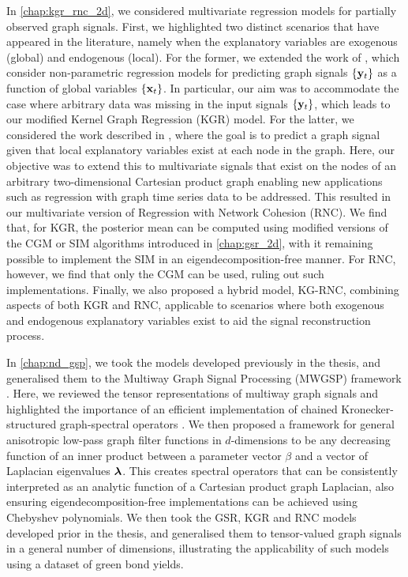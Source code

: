 In \cref{chap:kgr_rnc_2d}, we considered multivariate regression models for partially observed graph signals. First, we highlighted two distinct scenarios that have appeared in the literature, namely when the explanatory variables are exogenous (global) and endogenous (local). For the former, we extended the work of \cite{Venkitaraman2019,Venkitaraman2020}, which consider non-parametric regression models for predicting graph signals $\{\mathbf{y}_t\}$ as a function of global variables $\{\mathbf{x}_t\}$. In particular, our aim was to accommodate the case where arbitrary data was missing in the input signals $\{\mathbf{y}_t\}$, which leads to our modified Kernel Graph Regression (KGR) model. For the latter, we considered the work described in \cite{Li2019}, where the goal is to predict a graph signal given that local explanatory variables exist at each node in the graph. Here, our objective was to extend this to multivariate signals that exist on the nodes of an arbitrary two-dimensional Cartesian product graph enabling new applications such as regression with graph time series data to be addressed. This resulted in our multivariate version of Regression with Network Cohesion (RNC). We find that, for KGR, the posterior mean can be computed using modified versions of the CGM or SIM algorithms introduced in \cref{chap:gsr_2d}, with it remaining possible to implement the SIM in an eigendecomposition-free manner. For RNC, however, we find that only the CGM can be used, ruling out such implementations. Finally, we also proposed a hybrid model, KG-RNC, combining aspects of both KGR and RNC, applicable to scenarios where both exogenous and endogenous explanatory variables exist to aid the signal reconstruction process. 

In \cref{chap:nd_gsp}, we took the models developed previously in the thesis, and generalised them to the Multiway Graph Signal Processing (MWGSP) framework \citep{Stanley2020}. Here, we reviewed the tensor representations of multiway graph signals and highlighted the importance of an efficient implementation of chained Kronecker-structured graph-spectral operators \citep{Antonian2023}. We then proposed a framework for general anisotropic low-pass graph filter functions in $d$-dimensions to be any decreasing function of an inner product between a parameter vector $\beta$ and a vector of Laplacian eigenvalues $\boldsymbol{\lambda}$. This creates spectral operators that can be consistently interpreted as an analytic function of a Cartesian product graph Laplacian, also ensuring eigendecomposition-free implementations can be achieved using Chebyshev polynomials. We then took the GSR, KGR and RNC models developed prior in the thesis, and generalised them to tensor-valued graph signals in a general number of dimensions, illustrating the applicability of such models using a dataset of green bond yields. 


